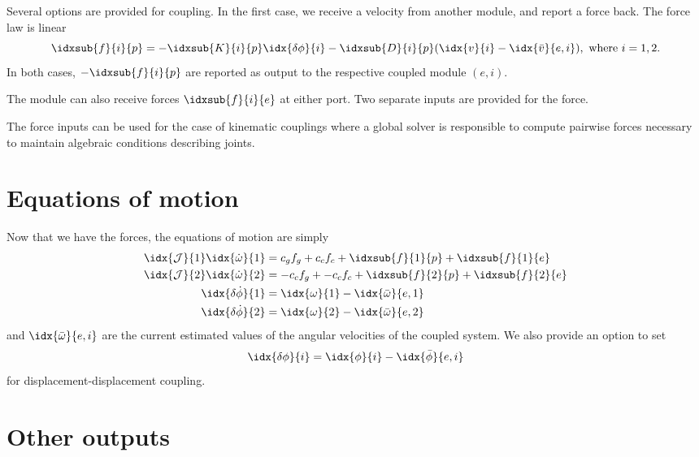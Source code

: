 \documentclass[10pt,notitlepage,abstracton]{scrartcl}
\theoremstyle{plain}
\theoremstyle{plain}
\theoremstyle{plain}
\begin{document}
Several options are provided for coupling.  In the first case, we receive a
velocity from another module, and report a force back.  The force law is
linear
\begin{equation}
  \label{eq:4}
  \idxsub{f}{i}{p} = - \idxsub{K}{i}{p}\idx{\delta\phi}{i} -
  \idxsub{D}{i}{p}(\idx{v}{i} -
  \idx{\bar{v}}{e,i}), \text{ where } i = 1,2.
\end{equation}
In both cases, $-\idxsub{f}{i}{p}$ are reported as output to the respective
coupled module $(e,i)$.  

The module can also receive forces $\idxsub{f}{i}{e}$ at either port. Two
separate inputs are provided for the force.

The force inputs can be used for the case of kinematic couplings where a
global solver is responsible to compute pairwise forces necessary to
maintain algebraic conditions describing joints. 

\section{Equations of motion}
\label{sec:equations-motion-1}

Now that we have the forces, the equations of motion are simply
\begin{equation}
  \label{eq:5}
  \begin{split}
    \idx{\mathcal{J}}{1}\idx{\dot{\omega}}{1} & = c_{g}f_{g} + c_{c}f_{c} +
    \idxsub{f}{1}{p} + \idxsub{f}{1}{e} \\
    \idx{\mathcal{J}}{2}\idx{\dot{\omega}}{2} & = -c_{c}f_{g} + -c_{c}f_{c} +
    \idxsub{f}{2}{p} + \idxsub{f}{2}{e} \\
    \idx{\delta\dot{\phi}}{1} &= \idx{\omega}{1} - \idx{\bar{\omega}}{e,1} \\
    \idx{\delta\dot{\phi}}{2} & =\idx{\omega}{2} - \idx{\bar{\omega}}{e,2} 
  \end{split}
\end{equation}
and $\idx{\bar{\omega}}{e,i}$ are the current estimated values of the
angular velocities of the coupled system.   We also provide an option to
set
\begin{equation}
  \label{eq:6}
  \idx{\delta\phi}{i}  = \idx{\phi}{i} - \idx{\bar{\phi}}{e,i}
\end{equation}
for displacement-displacement coupling.



\section{Other outputs}
\label{sec:other-outputs}
\end{document}
